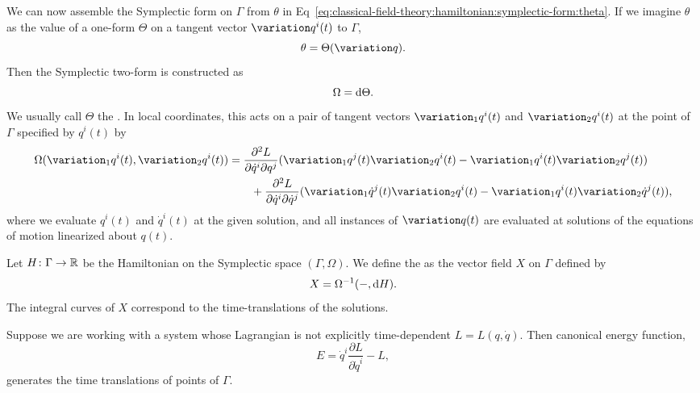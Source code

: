 We can now assemble the Symplectic form on $\Gamma$ from $\theta$ in Eq~\eqref{eq:classical-field-theory:hamiltonian:symplectic-form:theta}.
If we imagine $\theta$ as the value of a one-form $\Theta$ on a tangent
vector $\variation q^{i}(t)$ to $\Gamma$,
\begin{equation}
\theta = \Theta(\variation q).
\end{equation}
Then the Symplectic two-form is constructed as
\begin{equation}
\Omega = \mathrm{d}\Theta.
\end{equation}
We usually call $\Theta$ the .
In local coordinates, this acts on a pair of tangent vectors $\variation_{1}q^{i}(t)$
and $\variation_{2}q^{i}(t)$ at the point of $\Gamma$ specified by
$q^{i}(t)$ by
\begin{equation}
\begin{split}
\Omega(\variation_{1}q^{i}(t),\variation_{2}q^{i}(t))
&=\frac{\partial^{2}L}{\partial\dot{q}^{i}\partial q^{j}}(\variation_{1}q^{j}(t)\variation_{2}q^{i}(t)-\variation_{1}q^{i}(t)\variation_{2}q^{j}(t))\\
&\qquad+\frac{\partial^{2}L}{\partial\dot{q}^{i}\partial\dot{q}^{j}}(\variation_{1}\dot{q}^{j}(t)\variation_{2}q^{i}(t)-\variation_{1}q^{i}(t)\variation_{2}\dot{q}^{j}(t)),
\end{split}
\end{equation}
where we evaluate $q^{i}(t)$ and $\dot{q}^{i}(t)$ at the given solution,
and all instances of $\variation q(t)$ are evaluated at solutions of the
equations of motion linearized about $q(t)$.

\begin{definition}
Let $H\colon\Gamma\to\mathbb{R}$ be the Hamiltonian on the Symplectic space $(\Gamma,\Omega)$.
We define the  as the vector field $X$
on $\Gamma$ defined by
\begin{equation}
X = \Omega^{-1}(-,\mathrm{d} H).
\end{equation}
The integral curves of $X$ correspond to the time-translations of the solutions.
\end{definition}

\begin{theorem}
Suppose we are working with a system whose Lagrangian is not explicitly
time-dependent $L=L(q,\dot{q})$.
Then canonical energy function,
\begin{equation}
E = \dot{q}^{i}\frac{\partial L}{\partial\dot{q}^{i}}-L,
\end{equation}
generates the time translations of points of $\Gamma$.
\end{theorem}


